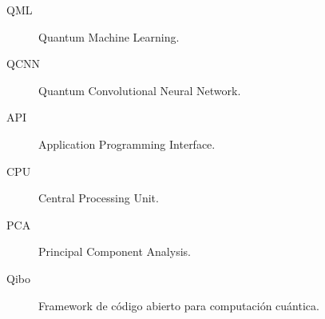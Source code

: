 \begin{description}
  \item[QML] Quantum Machine Learning.
  \item[QCNN] Quantum Convolutional Neural Network.
  \item[API] Application Programming Interface.
  \item[CPU] Central Processing Unit.
  \item[PCA] Principal Component Analysis.
  \item[Qibo] Framework de código abierto para computación cuántica.
\end{description}
